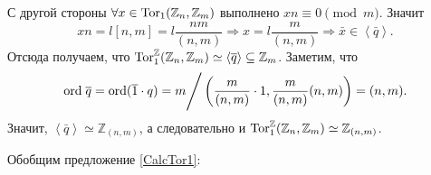\begin{Proof}
        С другой стороны $\forall x \in \textup{Tor}_1(\mathbb{Z}_n, \mathbb{Z}_m)$ выполнено $xn \equiv 0 \pmod{m}$. Значит 
        $$
            xn = l[n, m] = l\frac{nm}{(n, m)} \Rightarrow x = l\frac{m}{(n, m)} \Rightarrow \bar x \in \left<\bar q\right>.
        $$
        Отсюда получаем, что $\textup{Tor}_1^{\mathbb{Z}}(\mathbb{Z}_n, \mathbb{Z}_m) \simeq \left< \overline{q} \right> \subseteq \mathbb{Z}_m$.
        Заметим, что 
        \begin{equation*}
            \textup{ord}\; \overline{q} = \textup{ord}(\overline{1} \cdot q) = m \Bigg / \left( \frac{m}{(n, m)} \cdot 1, \frac{m}{(n, m)}(n, m) \right) = (n, m).
        \end{equation*}
        Значит, $\left<\bar q \right> \simeq \mathbb{Z}_{(n, m)}$, а следовательно и $\textup{Tor}_1^{\mathbb{Z}}(\mathbb{Z}_n, \mathbb{Z}_m) \simeq \mathbb{Z}_{(n, m)}$.
    \end{Proof}

    Обобщим предложение \ref{CalcTor1}:

